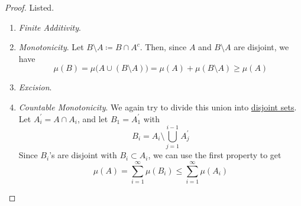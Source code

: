   \begin{proof}
    Listed. 
    \begin{enumerate}
      \item \textit{Finite Additivity}. 
      \item \textit{Monotonicity}. Let $B \setminus A \coloneqq B \cap A^c$. Then, since $A$ and $B \setminus A$ are disjoint, we have 
        \begin{equation}
          \mu(B) = \mu\big( A \cup (B \setminus A) \big) = \mu(A) + \mu(B \setminus A) \geq \mu(A)
        \end{equation}

      \item \textit{Excision}.
      \item \textit{Countable Monotonicity}. We again try to divide this union into \hyperref[st-def:disjoint-sets]{disjoint sets}. Let $A_i^\prime = A \cap A_i$, and let $B_1 = A_1^\prime$ with 
        \begin{equation}
          B_i = A_i \setminus \bigcup_{j=1}^{i-1} A^\prime_j
        \end{equation}
        Since $B_i$'s are disjoint with $B_i \subset A_i$, we can use the first property to get 
        \begin{equation}
          \mu(A) = \sum_{i=1}^\infty \mu(B_i) \leq \sum_{i=1}^\infty \mu(A_i)
        \end{equation}

    \end{enumerate}
  \end{proof}

